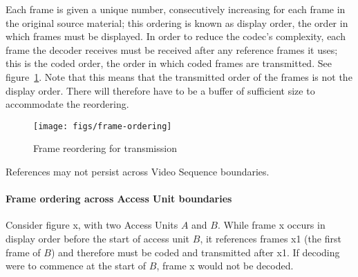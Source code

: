 Each frame is given a unique number, consecutively increasing for each
frame in the original source material; this ordering is known as display
order, the order in which frames must be displayed.  In order to reduce
the codec's complexity, each frame the decoder receives must be received
after any reference frames it uses; this is the coded order, the order
in which coded frames are transmitted. See
figure~\ref{fig:frame-ordering}. Note that this means that the
transmitted order of the frames is not the display order. There will
therefore have to be a buffer of sufficient size to accommodate the
reordering.

\begin{figure}
    \centering
    \texttt{[image: figs/frame-ordering]}
    \caption{Frame reordering for transmission}
    \label{fig:frame-ordering}
\end{figure}

References may not persist across Video Sequence boundaries.

\paragraph{Frame ordering across Access Unit boundaries}
Consider figure x, with two Access Units $A$ and $B$.  While frame
x occurs in display order before the start of access unit $B$, it
references frames x1 (the first frame of $B$) and therefore must be
coded and transmitted after x1.  If decoding were to commence at the
start of $B$, frame x would not be decoded.


